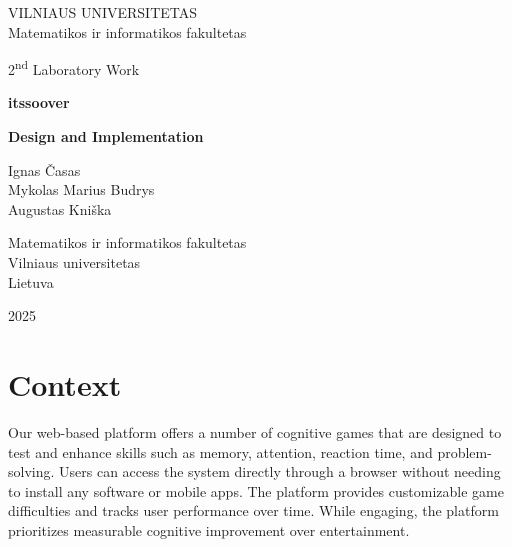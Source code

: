 \documentclass[11pt,a4paper]{article}
\begin{document}

\begin{titlepage}
    \centering
    \thispagestyle{empty}
    
    {\Large VILNIAUS UNIVERSITETAS\\
    Matematikos ir informatikos fakultetas}\par
    
    \vspace{3cm} %
    
    {\Large 2\textsuperscript{nd} Laboratory Work}\par
    \vspace{0.5cm}
    {\Large \textbf{itssoover}}\par
    {\Large \textbf{Design and Implementation}}\par
    
    \vspace{3cm}
    
    {\large
    Ignas Časas\\
    Mykolas Marius Budrys\\
    Augustas Kniška
    }\par
    
    \vspace{8cm}
    
    {\large
    Matematikos ir informatikos fakultetas\\
    Vilniaus universitetas\\
    Lietuva
    }\par
    
    \vfill

    \large 2025
    
\end{titlepage}

\tableofcontents
\newpage

\section{Context}
Our web-based platform offers a number of cognitive games that are designed to test and enhance skills such as memory, attention, reaction time, and problem-solving. Users can access the system directly through a browser without needing to install any software or mobile apps. The platform provides customizable game difficulties and tracks user performance over time. While engaging, the platform prioritizes measurable cognitive improvement over entertainment.
\end{document}
